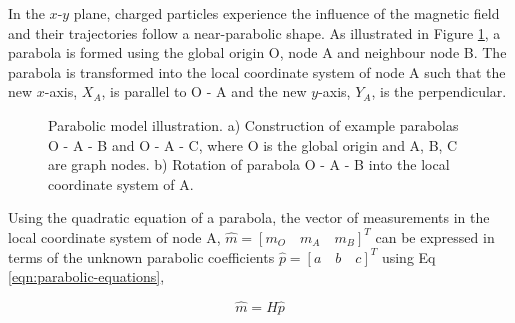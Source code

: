 In the $x$-$y$ plane, charged particles experience the influence of the magnetic field and their trajectories follow a near-parabolic shape. As illustrated in Figure \ref{fig:gnn-parabolic-model}, a parabola is formed using the global origin O, node A and neighbour node B. The parabola is transformed into the local coordinate system of node A such that the new $x$-axis, $X_A$, is parallel to O - A and the new $y$-axis, $Y_A$, is the perpendicular. 

\begin{figure}[htbp!] 
    \centering
    \hfill%
    \caption{Parabolic model illustration. a) Construction of example parabolas O - A - B and O - A - C, where O is the global origin and A, B, C are graph nodes. b) Rotation of parabola O - A - B into the local coordinate system of A.}
    \label{fig:gnn-parabolic-model}
\end{figure}


Using the quadratic equation of a parabola, the vector of measurements in the local coordinate system of node A, $ \hat{m} = [m_O \quad m_A \quad m_B]^{T}$ can be expressed in terms of the unknown parabolic coefficients $\hat{p} = [a \quad b \quad c]^{T}$ using Eq \eqref{eqn:parabolic-equations}, 

\begin{equation}
    \hat{m} = H \hat{p} 
    \label{eqn:parabolic-equations}
\end{equation}

